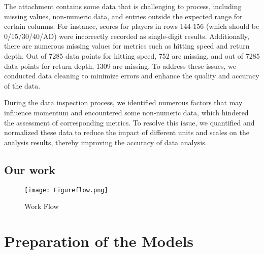 \documentclass[12pt]{article}
\begin{document}
The attachment contains some data that is challenging to process, including missing values, non-numeric data, and entries outside the expected range for certain columns. For instance, scores for players in rows 144-156 (which should be 0/15/30/40/AD) were incorrectly recorded as single-digit results. Additionally, there are numerous missing values for metrics such as hitting speed and return depth. Out of 7285 data points for hitting speed, 752 are missing, and out of 7285 data points for return depth, 1309 are missing. To address these issues, we conducted data cleaning to minimize errors and enhance the quality and accuracy of the data.

During the data inspection process, we identified numerous factors that may influence momentum and encountered some non-numeric data, which hindered the assessment of corresponding metrics. To resolve this issue, we quantified and normalized these data to reduce the impact of different units and scales on the analysis results, thereby improving the accuracy of data analysis.

\subsection{Our work}
\begin{figure}[H]
\centering
\texttt{[image: Figureflow.png]}
\caption{Work Flow}\label{fig:ourwork}
\end{figure}


\section{Preparation of the Models}
\end{document}
